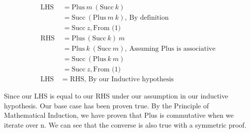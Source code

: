 \documentclass{article}
\begin{document}
    $$
    \begin{aligned}
        \text{LHS } & = \text{Plus}\ m\ (\text{Succ}\ k)\\
            & = \text{Succ}\ (\text{Plus}\ m\ k),\ \text{By definition}\\
            & = \text{Succ}\ z, \text{From (1)}\\
        \text{RHS } & = \text{Plus}\ (\text{Succ}\ k)\ m\\
            & = \text{Plus}\ k\ (\text{Succ}\ m),\ \text{Assuming Plus is associative}\\
            & = \text{Succ}\ (\text{Plus}\ k\ m)\\
            & = \text{Succ}\ z, \text{From (1)}\\
        \text{LHS } & = \text{ RHS, By our Inductive hypothesis}
    \end{aligned}
    $$

    Since our LHS is equal to our RHS under our assumption in our inductive hypothesis. Our base case has been proven true. By the Principle of Mathematical Induction, we have proven that Plus is commutative when we iterate over n. We can see that the converse is also true with a symmetric proof. 
\end{document}
